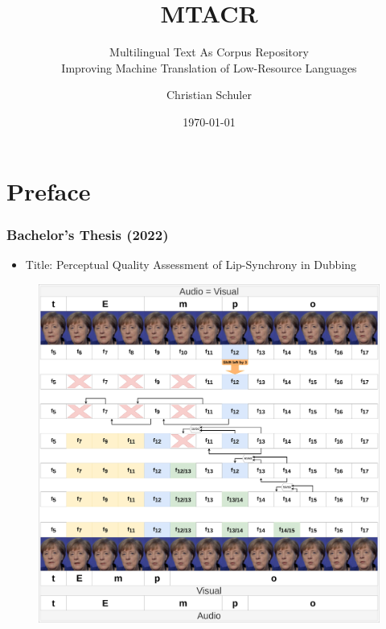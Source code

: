 \documentclass[aspectratio=169]{beamer}
\title[MTACR]{MTACR}
\subtitle{Multilingual Text As Corpus Repository \\Improving Machine Translation of Low-Resource Languages}
\author{Christian Schuler}
\institute{Funded Student's Project\\University of Hamburg and beyond}
\date{\today}
\begin{document}
\begin{frame}
	\titlepage
\end{frame}


\section{Preface}

\begin{frame}[fragile]
	\frametitle{Bachelor's Thesis (2022)}
    \begin{itemize}
        \item Title: Perceptual Quality Assessment of Lip-Synchrony in Dubbing
    \end{itemize}
    \begin{minipage}{.5\textwidth}
      \begin{figure}
        \centering
        \includegraphics[width=.9\textwidth]{images/DubbingThesisEditing-vL-merkl.png} 
    \end{figure}
    \end{minipage}%
    \begin{minipage}{.5\textwidth}
    \centering
        \begin{minipage}{.3\textwidth}

\end{minipage}
\end{minipage}
\end{frame}
\end{document}
